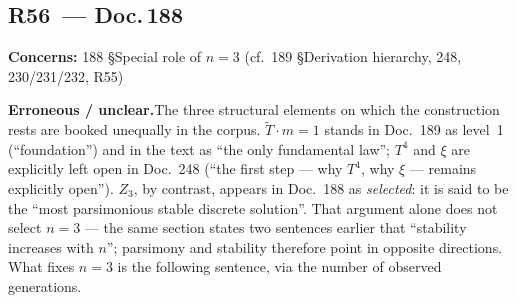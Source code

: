 \medskip


\subsection*{R56~--- Doc.\,188}

\noindent\textbf{Concerns:} 188 \S{}Special role of $n=3$ (cf.\ 189 \S{}Derivation hierarchy, 248, 230/231/232, R55)


\smallskip\noindent\textbf{Erroneous / unclear.}\quad The three structural elements on which the construction rests are booked unequally in the corpus. $\tilde{T}\cdot m = 1$ stands in Doc.~189 as level~1 (\enquote{foundation}) and in the text as \enquote{the only fundamental law}; $T^4$ and $\xi$ are explicitly left open in Doc.~248 (\enquote{the first step --- why $T^4$, why $\xi$ --- remains explicitly open}). $Z_3$, by contrast, appears in Doc.~188 as \emph{selected}: it is said to be the \enquote{most parsimonious stable discrete solution}. That argument alone does not select $n=3$ --- the same section states two sentences earlier that \enquote{stability increases with $n$}; parsimony and stability therefore point in opposite directions. What fixes $n=3$ is the following sentence, via the number of observed generations.


